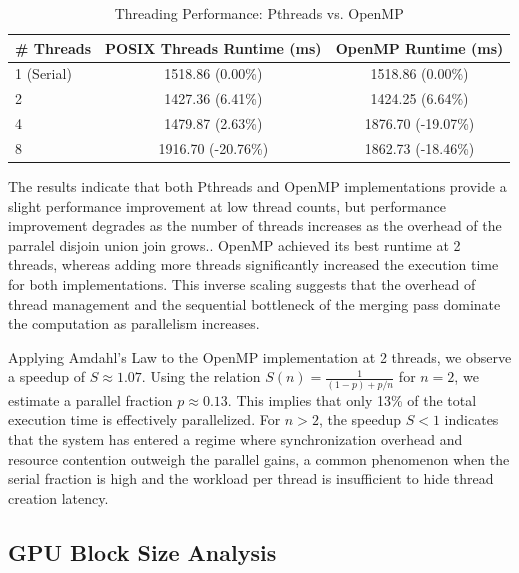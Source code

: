 \begin{table}[htbp]
	\centering
	\caption{Threading Performance: Pthreads vs. OpenMP}
	\label{tab:threading_comparison}
	\begin{tabular}{|l|c|c|}
		\hline
		\textbf{\# Threads} & \textbf{POSIX Threads Runtime (ms)} & \textbf{OpenMP Runtime (ms)} \\ \hline
		1 (Serial)          & 1518.86 (0.00\%)                    & 1518.86 (0.00\%)             \\ \hline
		2                   & 1427.36 (6.41\%)                    & 1424.25 (6.64\%)             \\ \hline
		4                   & 1479.87 (2.63\%)                    & 1876.70 (-19.07\%)           \\ \hline
		8                   & 1916.70 (-20.76\%)                  & 1862.73 (-18.46\%)           \\ \hline
	\end{tabular}
\end{table}


The results indicate that both Pthreads and OpenMP implementations provide a slight performance improvement at low thread counts, but performance improvement degrades as the number of threads increases as the overhead of the parralel disjoin union join grows..
OpenMP achieved its best runtime at 2 threads, whereas adding more threads significantly increased the execution time for both implementations.
This inverse scaling suggests that the overhead of thread management and the sequential bottleneck of the merging pass dominate the computation as parallelism increases.

Applying Amdahl's Law to the OpenMP implementation at 2 threads, we observe a speedup of $S \approx 1.07$. Using the relation $S(n) = \frac{1}{(1-p) + p/n}$ for $n=2$, we estimate a parallel fraction $p \approx 0.13$. This implies that only 13\% of the total execution time is effectively parallelized. For $n > 2$, the speedup $S < 1$ indicates that the system has entered a regime where synchronization overhead and resource contention outweigh the parallel gains, a common phenomenon when the serial fraction is high and the workload per thread is insufficient to hide thread creation latency.

\subsection{GPU Block Size Analysis}


